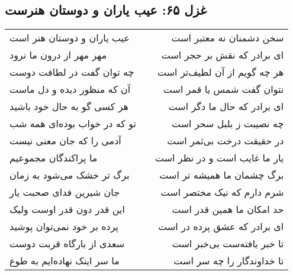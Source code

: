 \begin{center}
\section*{غزل ۶۵: عیب یاران و دوستان هنرست}
\label{sec:065}
\begin{longtable}{l p{0.5cm} r}
عیب یاران و دوستان هنر است
&&
سخن دشمنان نه معتبر است
\\
مهر مهر از درون ما نرود
&&
ای برادر که نقش بر حجر است
\\
چه توان گفت در لطافت دوست
&&
هر چه گویم از آن لطیف‌تر است
\\
آن که منظور دیده و دل ماست
&&
نتوان گفت شمس یا قمر است
\\
هر کسی گو به حال خود باشید
&&
ای برادر که حال ما دگر است
\\
تو که در خواب بوده‌ای همه شب
&&
چه نصیبت ز بلبل سحر است
\\
آدمی را که جان معنی نیست
&&
در حقیقت درخت بی‌ثمر است
\\
ما پراکندگان مجموعیم
&&
یار ما غایب است و در نظر است
\\
برگ تر خشک می‌شود به زمان
&&
برگ چشمان ما همیشه تر است
\\
جان شیرین فدای صحبت یار
&&
شرم دارم که نیک مختصر است
\\
این قدر دون قدر اوست ولیک
&&
حد امکان ما همین قدر است
\\
پرده بر خود نمی‌توان پوشید
&&
ای برادر که عشق پرده در است
\\
سعدی از بارگاه قربت دوست
&&
تا خبر یافته‌ست بی‌خبر است
\\
ما سر اینک نهاده‌ایم به طوع
&&
تا خداوندگار را چه سر است
\\
\end{longtable}
\end{center}
